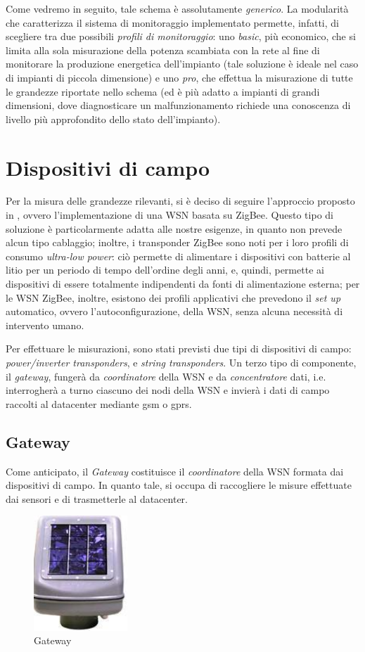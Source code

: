 %
Come vedremo in seguito, tale schema \`e assolutamente \emph{generico}. 
%
La modularit\`a che caratterizza il sistema di monitoraggio implementato permette, infatti, 
di scegliere tra due possibili \emph{profili di monitoraggio}: uno \emph{basic}, 
pi\`u economico, che si limita alla sola misurazione della potenza scambiata con 
la rete al fine di monitorare la produzione energetica dell'impianto (tale soluzione 
\`e ideale nel caso di impianti di piccola dimensione) e uno \emph{pro}, che effettua 
la misurazione di tutte le grandezze riportate nello schema (ed \`e pi\`u adatto a 
impianti di grandi dimensioni, dove diagnosticare un malfunzionamento richiede 
una conoscenza di livello pi\`u approfondito dello stato dell'impianto).
%

%
\section{Dispositivi di campo}
Per la misura delle grandezze rilevanti, si \`e deciso di seguire l'approccio
proposto in \cite{xiaoli11}, ovvero l'implementazione di una WSN basata 
su ZigBee. 
%
Questo tipo di soluzione \`e particolarmente adatta alle nostre esigenze, 
in quanto non prevede alcun tipo cablaggio; inoltre, i transponder 
ZigBee sono noti per i loro profili di consumo \emph{ultra-low power}: 
ci\`o permette di alimentare i dispositivi con batterie al litio per un periodo 
di tempo dell'ordine degli anni, e, quindi, permette ai dispositivi di essere
totalmente indipendenti da fonti di alimentazione esterna; per le WSN ZigBee, inoltre, 
esistono dei profili applicativi che prevedono il \emph{set up} automatico, 
ovvero l'autoconfigurazione, della WSN, senza alcuna necessit\`a di intervento 
umano.
%

%
Per effettuare le misurazioni, sono stati previsti due tipi di dispositivi di 
campo: \emph{power/inverter transponders}, e \emph{string transponders}.
%
Un terzo tipo di componente, il \emph{gateway}, funger\`a da \emph{coordinatore}
della WSN e da \emph{concentratore} dati, i.e. interrogher\`a a turno ciascuno
dei nodi della WSN e invier\`a i dati di campo raccolti al datacenter mediante 
gsm o gprs.
%

%
\subsection{Gateway}
%
Come anticipato, il \emph{Gateway} costituisce il \emph{coordinatore} della 
WSN formata dai dispositivi di campo.
%
In quanto tale, si occupa di raccogliere le misure effettuate dai sensori 
e di trasmetterle al datacenter.
%
\begin{figure}[!h]
\centering
\includegraphics[width=100pt]{img/gw.jpg}
\caption{Gateway}
\label{gw}
\end{figure}
%

